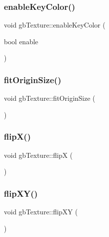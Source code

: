 \subsubsection{\texorpdfstring{enableKeyColor()}{enableKeyColor()}}
{\footnotesize\ttfamily void gb\+Texture\+::enable\+Key\+Color (\begin{DoxyParamCaption}\item[{bool}]{enable }\end{DoxyParamCaption})\hspace{0.3cm}{\ttfamily [inline]}}

\mbox{\label{classgb_texture_a9de73627cbfa8906a508de183b99f550}} 
\subsubsection{\texorpdfstring{fitOriginSize()}{fitOriginSize()}}
{\footnotesize\ttfamily void gb\+Texture\+::fit\+Origin\+Size (\begin{DoxyParamCaption}{ }\end{DoxyParamCaption})}

\mbox{\label{classgb_texture_abbccc677a55cff11d466a3ca9421a526}} 
\subsubsection{\texorpdfstring{flipX()}{flipX()}}
{\footnotesize\ttfamily void gb\+Texture\+::flipX (\begin{DoxyParamCaption}{ }\end{DoxyParamCaption})\hspace{0.3cm}{\ttfamily [inline]}}

\mbox{\label{classgb_texture_aac482919f76665dc6c0fde66828376c3}} 
\subsubsection{\texorpdfstring{flipXY()}{flipXY()}}
{\footnotesize\ttfamily void gb\+Texture\+::flip\+XY (\begin{DoxyParamCaption}{ }\end{DoxyParamCaption})\hspace{0.3cm}{\ttfamily [inline]}}


